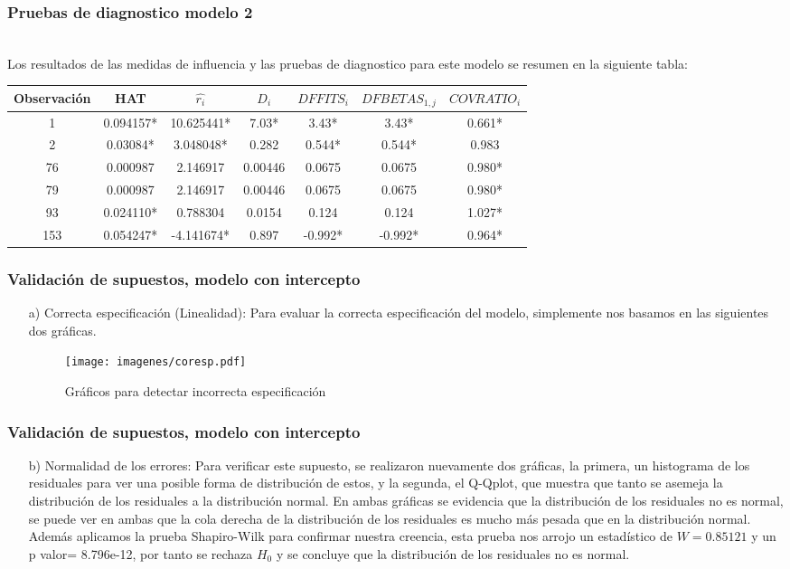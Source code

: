 \documentclass[12pt]{beamer}
\begin{document}
\begin{frame}
\frametitle{Pruebas de diagnostico modelo 2}
~\\Los resultados de las medidas de influencia y las pruebas de diagnostico para este modelo se resumen en la siguiente tabla:

\begin{center}
\resizebox{12.2cm}{!} {
\begin{tabular}{|ccccccc|}
\hline 
Observación & HAT & $\hat{r_{i}} $ &$D_{i}$ & $DFFITS_{i}$ & $DFBETAS_{1,j}$ & $COVRATIO_{i}$ \\ 
\hline 
1 & 0.094157* & 10.625441* & 7.03* & 3.43* &  3.43* & 0.661* \\ 
2 & 0.03084* & 3.048048* & 0.282 & 0.544* & 0.544* & 0.983 \\  
76 & 0.000987 & 2.146917  & 0.00446 & 0.0675 &  0.0675 & 0.980* \\  
79 & 0.000987 & 2.146917 & 0.00446 & 0.0675  & 0.0675 & 0.980* \\ 
93 & 0.024110* & 0.788304 & 0.0154 & 0.124  & 0.124 & 1.027* \\ 
153 & 0.054247* & -4.141674*  & 0.897 & -0.992*  & -0.992* & 0.964* \\ 
\hline 
\end{tabular} 
}
\end{center}
\end{frame}

\begin{frame}
\frametitle{Validación de supuestos, modelo con intercepto}
\begin{itemize}
\item[a)] Correcta especificación (Linealidad): Para evaluar la correcta especificación del modelo, simplemente nos basamos en las siguientes dos gráficas. 
\begin{figure}[h]
  \centering
  \texttt{[image: imagenes/coresp.pdf]}
  \caption{Gráficos para detectar incorrecta especificación }\label{figura1}
\end{figure}
\end{itemize}
\end{frame}

\begin{frame}
\frametitle{Validación de supuestos, modelo con intercepto}
\begin{itemize}
\item[b)] Normalidad de los errores: Para verificar este supuesto, se realizaron nuevamente dos gráficas, la primera, un histograma de los residuales para ver una posible forma de distribución de estos, y la segunda, el Q-Qplot, que muestra que tanto se asemeja la distribución de los residuales a la distribución normal. En ambas gráficas se evidencia que la distribución de los residuales no es normal, se puede ver en ambas que la cola derecha de la distribución de los residuales es mucho más pesada que en la distribución normal. Además aplicamos la prueba Shapiro-Wilk para confirmar nuestra creencia, esta prueba nos arrojo un estadístico de $W = 0.85121$ y un p valor= 8.796e-12, por tanto se rechaza $H_{0}$ y se concluye que la distribución de los residuales no es normal.
\end{itemize}
\end{frame}
\end{document}
